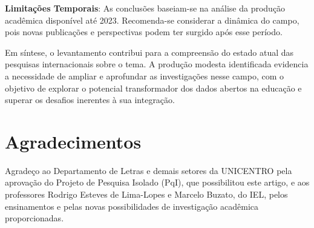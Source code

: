 \documentclass[portuguese]{textolivre}
\begin{document}
\textbf{Limitações Temporais}: As conclusões baseiam-se na análise da produção acadêmica disponível até 2023. Recomenda-se considerar a dinâmica do campo, pois novas publicações e perspectivas podem ter surgido após esse período.

Em síntese, o levantamento contribui para a compreensão do estado atual das pesquisas internacionais sobre o tema. A produção modesta identificada evidencia a necessidade de ampliar e aprofundar as investigações nesse campo, com o objetivo de explorar o potencial transformador dos dados abertos na educação e superar os desafios inerentes à sua integração.

\section{Agradecimentos}\label{sec-idioma}
Agradeço ao Departamento de Letras e demais setores da UNICENTRO pela aprovação do Projeto de Pesquisa Isolado (PqI), que possibilitou este artigo, e aos professores Rodrigo Esteves de Lima-Lopes e Marcelo Buzato, do IEL, pelos ensinamentos e pelas novas possibilidades de investigação acadêmica proporcionadas.


\printbibliography\label{sec-bib}
\end{document}
